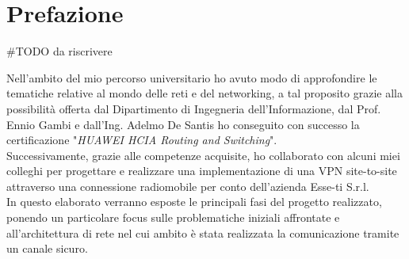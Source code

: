 \clearpage
\phantom{a}
\vfill


\chapter{Prefazione}


\begin{flushleft}

    \#TODO da riscrivere 

    Nell'ambito del mio percorso universitario ho avuto modo di approfondire le tematiche relative al mondo delle reti e del networking, a tal proposito grazie alla possibilità offerta dal Dipartimento di Ingegneria dell'Informazione, dal Prof. Ennio Gambi e dall'Ing. Adelmo De Santis ho conseguito con successo la certificazione "\textit{HUAWEI HCIA Routing and Switching}".\\
    Successivamente, grazie alle competenze acquisite, ho collaborato con alcuni miei colleghi
    per progettare e realizzare una implementazione di una VPN site-to-site attraverso una connessione radiomobile per conto dell'azienda Esse-ti S.r.l.\\
    In questo elaborato verranno esposte le principali fasi del
    progetto realizzato, ponendo un particolare focus sulle problematiche iniziali affrontate e all'architettura di rete nel cui ambito è stata realizzata la comunicazione tramite un canale sicuro.
    

\end{flushleft}



\vfill
\newpage